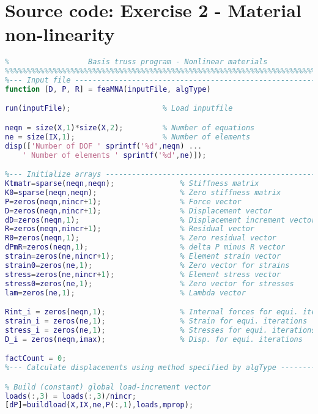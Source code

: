 \chapter{Source code: Exercise 2 - Material non-linearity}
\vspace{2mm}
\begin{lstlisting}[language=Matlab, caption = FE implementation for material non-linearity, label=lst:CodeMNA]
%%%%%%%%%%%%%%%%%%%%%%%%%%%%%%%%%%%%%%%%%%%%%%%%%%%%%%%%%%%%%%%%%%%%%%%%%%%
%                  Basis truss program - Nonlinear materials              %
%%%%%%%%%%%%%%%%%%%%%%%%%%%%%%%%%%%%%%%%%%%%%%%%%%%%%%%%%%%%%%%%%%%%%%%%%%%
%--- Input file ----------------------------------------------------------%
function [D, P, R] = feaMNA(inputFile, algType)

run(inputFile);                     % Load inputfile

neqn = size(X,1)*size(X,2);         % Number of equations
ne = size(IX,1);                    % Number of elements
disp(['Number of DOF ' sprintf('%d',neqn) ...
    ' Number of elements ' sprintf('%d',ne)]);

%--- Initialize arrays ---------------------------------------------------%
Ktmatr=sparse(neqn,neqn);               % Stiffness matrix
K0=sparse(neqn,neqn);                   % Zero stiffness matrix
P=zeros(neqn,nincr+1);                  % Force vector
D=zeros(neqn,nincr+1);                  % Displacement vector
dD=zeros(neqn,1);                       % Displacement increment vector
R=zeros(neqn,nincr+1);                  % Residual vector
R0=zeros(neqn,1);                       % Zero residual vector
dPmR=zeros(neqn,1);                     % delta P minus R vector
strain=zeros(ne,nincr+1);               % Element strain vector
strain0=zeros(ne,1);                    % Zero vector for strains
stress=zeros(ne,nincr+1);               % Element stress vector
stress0=zeros(ne,1);                    % Zero vector for stresses
lam=zeros(ne,1);                        % Lambda vector

Rint_i = zeros(neqn,1);                 % Internal forces for equi. iters
strain_i = zeros(ne,1);                 % Strain for equi. iterations
stress_i = zeros(ne,1);                 % Stresses for equi. iterations
D_i = zeros(neqn,imax);                 % Disp. for equi. iterations

factCount = 0;
%--- Calculate displacements using method specified by algType -----------%

% Build (constant) global load-increment vector
loads(:,3) = loads(:,3)/nincr;
[dP]=buildload(X,IX,ne,P(:,1),loads,mprop);


\end{lstlisting}
